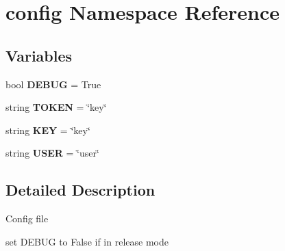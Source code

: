 \hypertarget{namespaceconfig}{}\section{config Namespace Reference}
\label{namespaceconfig}
\subsection*{Variables}
\begin{DoxyCompactItemize}
\item 
bool {\bfseries D\+E\+B\+UG} = True\hypertarget{namespaceconfig_a724624511bb4421342750937ce1b996a}{}\label{namespaceconfig_a724624511bb4421342750937ce1b996a}

\item 
string {\bfseries T\+O\+K\+EN} = \char`\"{}key\char`\"{}\hypertarget{namespaceconfig_a35a897b6a967c86246866af8b1f0e637}{}\label{namespaceconfig_a35a897b6a967c86246866af8b1f0e637}

\item 
string {\bfseries K\+EY} = \char`\"{}key\char`\"{}\hypertarget{namespaceconfig_a3332cb518e3039b5b38b49c99fd58e82}{}\label{namespaceconfig_a3332cb518e3039b5b38b49c99fd58e82}

\item 
string {\bfseries U\+S\+ER} = \char`\"{}user\char`\"{}\hypertarget{namespaceconfig_a094039331310fa8fc5ba1eaa8082c1f0}{}\label{namespaceconfig_a094039331310fa8fc5ba1eaa8082c1f0}

\end{DoxyCompactItemize}


\subsection{Detailed Description}
\begin{DoxyVerb}Config file

set DEBUG to False if in release mode
\end{DoxyVerb}
 